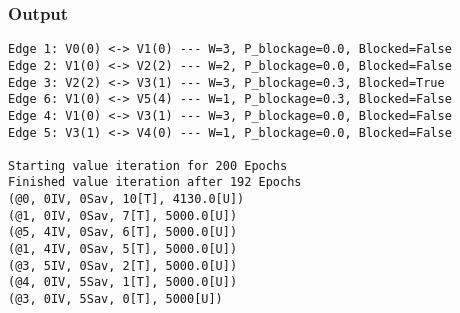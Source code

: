 \documentclass{article}                     %
\begin{document}
\subsubsection{Output}
\begin{verbatim}
Edge 1: V0(0) <-> V1(0) --- W=3, P_blockage=0.0, Blocked=False
Edge 2: V1(0) <-> V2(2) --- W=2, P_blockage=0.0, Blocked=False
Edge 3: V2(2) <-> V3(1) --- W=3, P_blockage=0.3, Blocked=True
Edge 6: V1(0) <-> V5(4) --- W=1, P_blockage=0.3, Blocked=False
Edge 4: V1(0) <-> V3(1) --- W=3, P_blockage=0.0, Blocked=False
Edge 5: V3(1) <-> V4(0) --- W=1, P_blockage=0.0, Blocked=False

Starting value iteration for 200 Epochs
Finished value iteration after 192 Epochs
(@0, 0IV, 0Sav, 10[T], 4130.0[U])
(@1, 0IV, 0Sav, 7[T], 5000.0[U])
(@5, 4IV, 0Sav, 6[T], 5000.0[U])
(@1, 4IV, 0Sav, 5[T], 5000.0[U])
(@3, 5IV, 0Sav, 2[T], 5000.0[U])
(@4, 0IV, 5Sav, 1[T], 5000.0[U])
(@3, 0IV, 5Sav, 0[T], 5000[U])
\end{verbatim}
\end{document}
